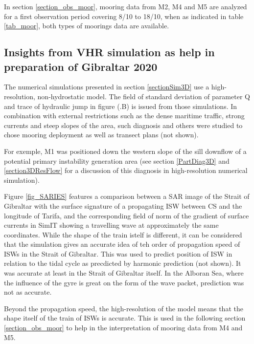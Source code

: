 In section \ref{section_obs_moor}, mooring data from M2, M4 and M5 are analyzed for a first observation period covering 8/10 to 18/10, when as indicated in table \ref{tab_moor}, both types of moorings data are available.


\subsection{Insights from VHR simulation as help in preparation of Gibraltar 2020}

The numerical simulations presented in section \ref{sectionSim3D} use a high-resolution, non-hydrostatic model. The field of standard deviation of parameter Q and trace of hydraulic jump in figure (.B) is issued from those simulations. In combination with external restrictions such as the dense maritime traffic, strong currents and steep slopes of the area, such diagnosis and others were studied to chose mooring deployment as well as transect plans (not shown).

For exemple, M1 was positioned down the western slope of the sill downflow of a potential primary instability generation area (see section \ref{PartDiag3D} and \ref{section3DResFlow} for a discussion of this diagnosis in high-resolution numerical simulation).

Figure \ref{fig_SARIES} features a comparison between a SAR image of the Strait of Gibraltar with the surface signature of a propagating ISW between CS and the longitude of Tarifa, and the corresponding field of norm of the gradient of surface currents in SimIT showing a travelling wave at approximately the same coordinates. While the shape of the train istelf is different, it can be considered that the simulation gives an accurate idea of teh order of propagation speed of ISWs in the Strait of Gibraltar. This was used to predict position of ISW in relation to the tidal cycle as precdicted by harmonic prediction  (not shown). It was accurate at least in the Strait of Gibraltar itself. In the Alboran Sea, where the influence of the gyre is great on the form of the wave packet, prediction was not as accurate. 

Beyond the propagation speed, the high-resolution of the model means that the shape itself of the train of ISWs is accurate. This is used in the following section \ref{section_obs_moor} to help in the interpretation of mooring data from M4 and M5.

